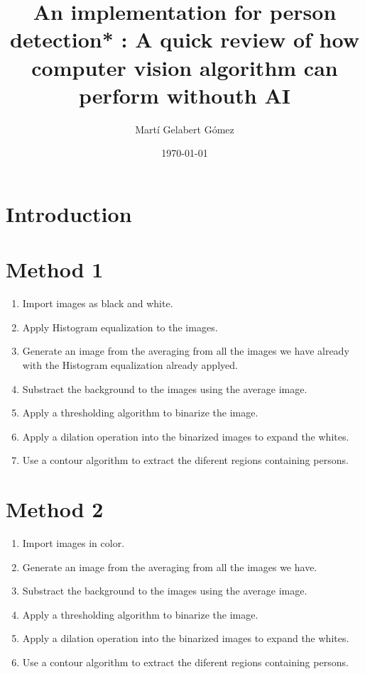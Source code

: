 \documentclass[11pt,twoside,a4paper]{article}
\title{An implementation for person detection* : A quick review of how computer vision algorithm can perform withouth AI
}
\author{Martí Gelabert Gómez}
\date{\today}
\begin{document}
\maketitle
\tableofcontents


\section{Introduction}




\section{Method 1}
\begin{enumerate}
\item Import images as black and white.
\item Apply Histogram equalization to the images.
\item Generate an image from the averaging from all the images we have already with the Histogram equalization already applyed.
\item Substract the background to the images using the average image.
\item Apply a thresholding algorithm to binarize the image.
\item Apply a dilation operation into the binarized images to expand the whites.
\item Use a contour algorithm to extract the diferent regions containing persons.
\end{enumerate}

\section{Method 2}
\begin{enumerate}
\item Import images in color.
\item Generate an image from the averaging from all the images we have.
\item Substract the background to the images using the average image.
\item Apply a thresholding algorithm to binarize the image.
\item Apply a dilation operation into the binarized images to expand the whites.
\item Use a contour algorithm to extract the diferent regions containing persons.
\end{enumerate}
\end{document}
